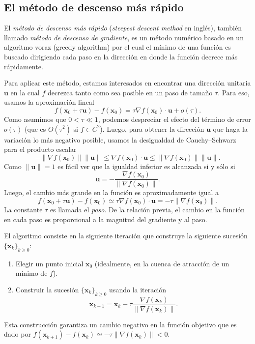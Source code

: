 \documentclass[12pt, a4paper]{amsbook}
\newcommand{\uu}{{\mathbf u}}
\newcommand{\xx}{{\mathbf x}}
\theoremstyle{remark}
\theoremstyle{definition}
\numberwithin{section}{chapter}
\numberwithin{subsection}{section}
\numberwithin{equation}{section}
\numberwithin{figure}{chapter}
\begin{document}
\subsection{El método de descenso más rápido}

El {\em método de descenso más rápido} ({\em steepest descent method} en inglés), también llamado {\em método de descenso de gradiente}, es un método numérico basado en un algoritmo voraz (greedy algorithm) por el cual el mínimo de una función es buscado dirigiendo cada paso en la dirección en donde la función decrece más rápidamente.

Para aplicar este método, estamos interesados en encontrar una dirección unitaria $\uu$ en la cual $f$ decrezca tanto como sea posible en un paso de tamaño $\tau$. Para eso, usamos la aproximación lineal
$$
f(\xx_0+\tau\uu) - f(\xx_0) = \tau \nabla f(\xx_0)\cdot \uu + o(\tau).
$$
Como asumimos que $0<\tau\ll 1$, podemos despreciar el efecto del término de error $o(\tau)$ (que es $O(\tau^2)$ si $f\in C^2$). Luego, para obtener la dirección $\uu$ que haga la variación lo más negativo posible, usamos la desigualdad de Cauchy--Schwarz para el producto escalar
$$
-\|\nabla f(\xx_0)\| \|\uu\|\le \nabla f(\xx_0)\cdot \uu\le \|\nabla f(\xx_0)\| \|\uu\|.
$$
Como $\|\uu\|=1$ es fácil ver que la igualdad inferior es alcanzada si y sólo si
$$
\uu = -\frac{\nabla f(\xx_0)}{\|\nabla f(\xx_0)\|}.
$$
Luego, el cambio más grande en la función es aproximadamente igual a
$$
f(\xx_0+\tau\uu) - f(\xx_0) \simeq \tau \nabla f(\xx_0)\cdot \uu = -\tau\|\nabla f(\xx_0)\|.
$$
La constante $\tau$ es llamada el {\em paso}. De la relación previa, el cambio en la función en cada paso es proporcional a la magnitud del gradiente y al paso.

El algoritmo consiste en la siguiente iteración que construye la siguiente sucesión $\{\xx_k\}_{k\ge 0}$:
\begin{enumerate}
\item Elegir un punto inicial $\xx_0$ (idealmente, en la cuenca de atracción de un mínimo de $f$).

\item Construir la sucesión $\{\xx_k\}_{k\ge 0}$ usando la iteración
\begin{equation}\label{iteracion}
\xx_{k+1} = \xx_k - \tau \frac{\nabla f(\xx_k)}{\|\nabla f(\xx_k)\|}.
\end{equation}
\end{enumerate}
Esta construcción garantiza un cambio negativo en la función objetivo que es dado por $f(\xx_{k+1}) - f(\xx_k)\simeq -\tau\|\nabla f(\xx_k)\|<0$.
\end{document}
